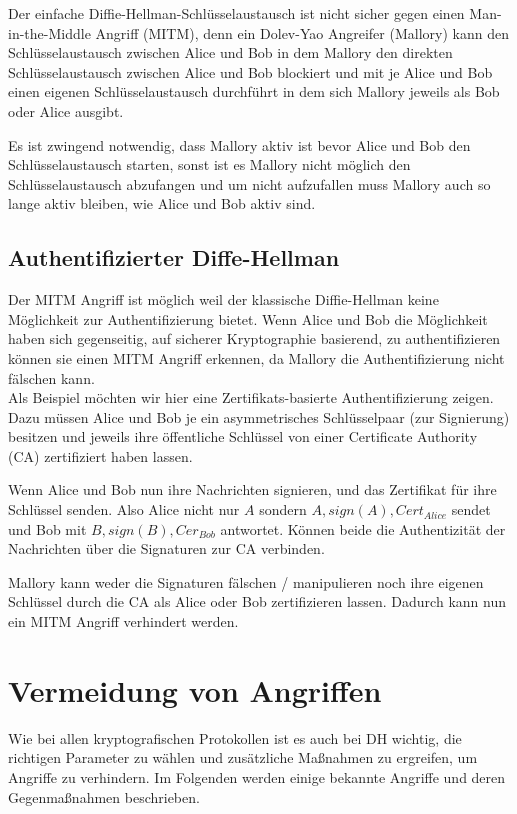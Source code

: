 \documentclass[conference]{IEEEtran}
\begin{document}
Der einfache Diffie-Hellman-Schlüsselaustausch ist nicht sicher gegen einen Man-in-the-Middle Angriff (MITM), denn ein Dolev-Yao Angreifer (Mallory) kann den Schlüsselaustausch zwischen Alice und Bob in dem Mallory den direkten Schlüsselaustausch zwischen Alice und Bob blockiert und mit je Alice und Bob einen eigenen Schlüsselaustausch durchführt in dem sich Mallory jeweils als Bob oder Alice ausgibt.

Es ist zwingend notwendig, dass Mallory aktiv ist bevor Alice und Bob den Schlüsselaustausch starten, sonst ist es Mallory nicht möglich den Schlüsselaustausch abzufangen und um nicht aufzufallen muss Mallory auch so lange aktiv bleiben, wie Alice und Bob aktiv sind.

\subsection{Authentifizierter Diffe-Hellman}

Der MITM Angriff ist möglich weil der klassische Diffie-Hellman keine Möglichkeit zur Authentifizierung bietet.
Wenn Alice und Bob die Möglichkeit haben sich gegenseitig, auf sicherer Kryptographie basierend, zu authentifizieren können sie einen MITM Angriff erkennen, da Mallory die Authentifizierung nicht fälschen kann.
\\

Als Beispiel möchten wir hier eine Zertifikats-basierte Authentifizierung zeigen. Dazu müssen Alice und Bob je ein asymmetrisches  Schlüsselpaar (zur Signierung) besitzen und jeweils ihre öffentliche Schlüssel von einer Certificate Authority (CA) zertifiziert haben lassen.

Wenn Alice und Bob nun ihre Nachrichten signieren, und das Zertifikat für ihre Schlüssel senden.
Also Alice nicht nur $A$ sondern $A, sign(A), Cert_{Alice}$ sendet und Bob mit $B, sign(B), Cer_{Bob}$ antwortet.
Können beide die Authentizität der Nachrichten über die Signaturen zur CA verbinden.

Mallory kann weder die Signaturen fälschen / manipulieren noch ihre eigenen Schlüssel durch die CA als Alice oder Bob zertifizieren lassen.
Dadurch kann nun ein MITM Angriff verhindert werden.

\section{Vermeidung von Angriffen}

Wie bei allen kryptografischen Protokollen ist es auch bei DH wichtig, die richtigen Parameter zu wählen und zusätzliche Maßnahmen zu ergreifen, um Angriffe zu verhindern. Im Folgenden werden einige bekannte Angriffe und deren Gegenmaßnahmen beschrieben.
\end{document}
